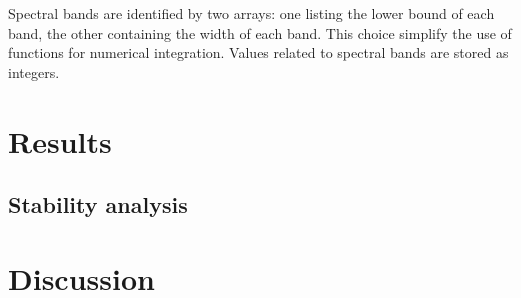 \documentclass[a4paper,10pt,final,twocolumn]{article}
\begin{document}
Spectral bands are identified by two arrays: one listing the lower bound of each band, the other containing the width of each band. This choice simplify the use of functions for numerical integration. Values related to spectral bands are stored as integers.



\section{Results}



\subsection{Stability analysis}



\section{Discussion}
\end{document}
